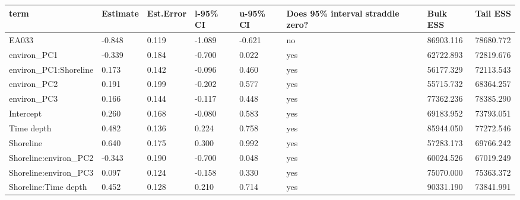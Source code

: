 \begin{tabular}{p{4.2cm}p{1.8cm}p{1.8cm}p{1.8cm}p{1.8cm}p{1.8cm}p{1.8cm}p{1.8cm}}
  \toprule
term & Estimate & Est.Error & l-95\% CI & u-95\% CI & Does 95\% interval straddle zero? & Bulk ESS & Tail ESS \\ 
  \midrule
EA033 & -0.848 & 0.119 & -1.089 & -0.621 & no & 86903.116 & 78680.772 \\ 
  environ\_PC1 & -0.339 & 0.184 & -0.700 & 0.022 & yes & 62722.893 & 72819.676 \\ 
  environ\_PC1:Shoreline & 0.173 & 0.142 & -0.096 & 0.460 & yes & 56177.329 & 72113.543 \\ 
  environ\_PC2 & 0.191 & 0.199 & -0.202 & 0.577 & yes & 55715.732 & 68364.257 \\ 
  environ\_PC3 & 0.166 & 0.144 & -0.117 & 0.448 & yes & 77362.236 & 78385.290 \\ 
  Intercept & 0.260 & 0.168 & -0.080 & 0.583 & yes & 69183.952 & 73793.051 \\ 
  Time depth & 0.482 & 0.136 & 0.224 & 0.758 & yes & 85944.050 & 77272.546 \\ 
  Shoreline & 0.640 & 0.175 & 0.300 & 0.992 & yes & 57283.173 & 69766.242 \\ 
  Shoreline:environ\_PC2 & -0.343 & 0.190 & -0.700 & 0.048 & yes & 60024.526 & 67019.249 \\ 
  Shoreline:environ\_PC3 & 0.097 & 0.124 & -0.158 & 0.330 & yes & 75070.000 & 75363.372 \\ 
  Shoreline:Time depth & 0.452 & 0.128 & 0.210 & 0.714 & yes & 90331.190 & 73841.991 \\ 
   \bottomrule
\end{tabular}
